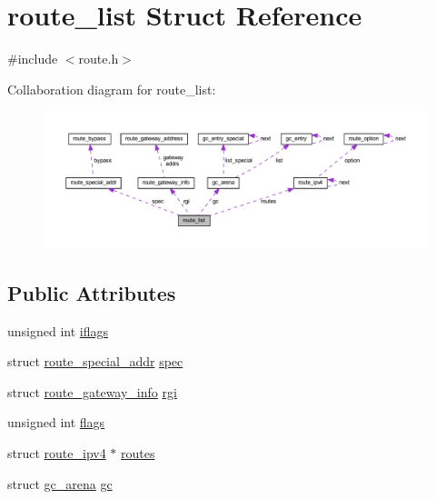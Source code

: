 \hypertarget{structroute__list}{}\section{route\+\_\+list Struct Reference}
\label{structroute__list}


{\ttfamily \#include $<$route.\+h$>$}



Collaboration diagram for route\+\_\+list\+:
\nopagebreak
\begin{figure}[H]
\begin{center}
\leavevmode
\includegraphics[width=350pt]{structroute__list__coll__graph}
\end{center}
\end{figure}
\subsection*{Public Attributes}
\begin{DoxyCompactItemize}
\item 
unsigned int \hyperlink{structroute__list_afd4d48cc38b5ebeb7f64a133c7decdff}{iflags}
\item 
struct \hyperlink{structroute__special__addr}{route\+\_\+special\+\_\+addr} \hyperlink{structroute__list_a8b0265a1e6b98143c03ff728b232a454}{spec}
\item 
struct \hyperlink{structroute__gateway__info}{route\+\_\+gateway\+\_\+info} \hyperlink{structroute__list_a366bf50ec63559c4577cd28670cef3f8}{rgi}
\item 
unsigned int \hyperlink{structroute__list_ac0e940e04d4b5156590f41552d9bcef9}{flags}
\item 
struct \hyperlink{structroute__ipv4}{route\+\_\+ipv4} $\ast$ \hyperlink{structroute__list_a87e014a2d9333f896c538c82abc9e263}{routes}
\item 
struct \hyperlink{structgc__arena}{gc\+\_\+arena} \hyperlink{structroute__list_ad209cc7d8c318bf74a05b6d7472941f4}{gc}
\end{DoxyCompactItemize}


